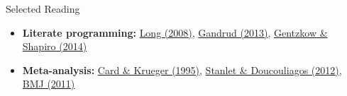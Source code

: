 \documentclass[12pt, compress]{beamer} %
\let\noteitem\item %
\renewcommand{\item}{ 
	\noteitem\vspace{\fill}
	}
\begin{document}
\begin{frame}{Selected Reading}
\begin{itemize}
	\item \textbf{Literate programming:} \href{https://www.amazon.com/Workflow-Data-Analysis-Using-Stata/dp/1597180475}{Long (2008)}, \href{https://www.amazon.com/Reproducible-Research-Studio-Chapman-Hall/dp/1466572841}{Gandrud (2013)}, \href{http://www.brown.edu/Research/Shapiro/pdfs/CodeAndData.pdf}{Gentzkow \& Shapiro (2014)}
	\item \textbf{Meta-analysis:} \href{http://www.jstor.org/stable/2117925?seq=1\#page\_scan\_tab\_contents}{Card \& Krueger (1995)}, \href{https://www.amazon.com/Meta-Regression-Analysis-Economics-Business-Routledge/dp/0415670780}{Stanlet \& Doucouliagos (2012)}, \href{http://www.bmj.com/content/343/bmj.d4002}{BMJ (2011)}
	\end{itemize}

\end{frame}
\end{document}
